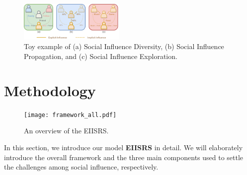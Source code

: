\documentclass[letterpaper]{article} %
\begin{document}
\begin{figure}[ht!]
  \centering
  \includegraphics[width=0.451\textwidth]{motivation.pdf} %
  \caption{Toy example of (a) Social Influence Diversity, (b) Social Influence Propagation, and (c) Social Influence Exploration.}
  \label{fig_motivation}
\end{figure}

\section{Methodology}
\begin{figure}[ht]
  \centering
  \texttt{[image: framework\_all.pdf]}
  \caption{An overview of the EIISRS.}
  \label{framework_all.pdf}
\end{figure}

In this section, we introduce our model \textbf{EIISRS} in detail. We will elaborately introduce the overall framework and the three main components used to settle the challenges among social influence, respectively.
\end{document}
